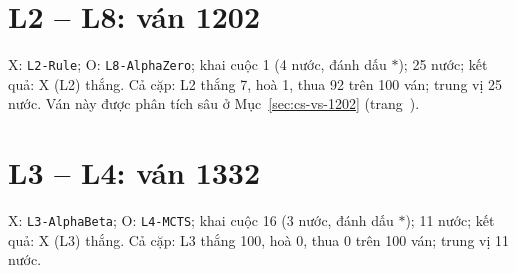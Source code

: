 \section{L2 -- L8: ván 1202}
\label{sec:cs-van-13}
X: \texttt{L2-Rule}; O: \texttt{L8-AlphaZero}; khai cuộc 1 (4 nước, đánh dấu $\ast$); 25 nước; kết quả: X (L2) thắng. Cả cặp: L2 thắng 7, hoà 1, thua 92 trên 100 ván; trung vị 25 nước.
Ván này được phân tích sâu ở Mục~\ref{sec:cs-vs-1202} (trang~\pageref{sec:cs-vs-1202}).

\section{L3 -- L4: ván 1332}
\label{sec:cs-van-14}
X: \texttt{L3-AlphaBeta}; O: \texttt{L4-MCTS}; khai cuộc 16 (3 nước, đánh dấu $\ast$); 11 nước; kết quả: X (L3) thắng. Cả cặp: L3 thắng 100, hoà 0, thua 0 trên 100 ván; trung vị 11 nước.
